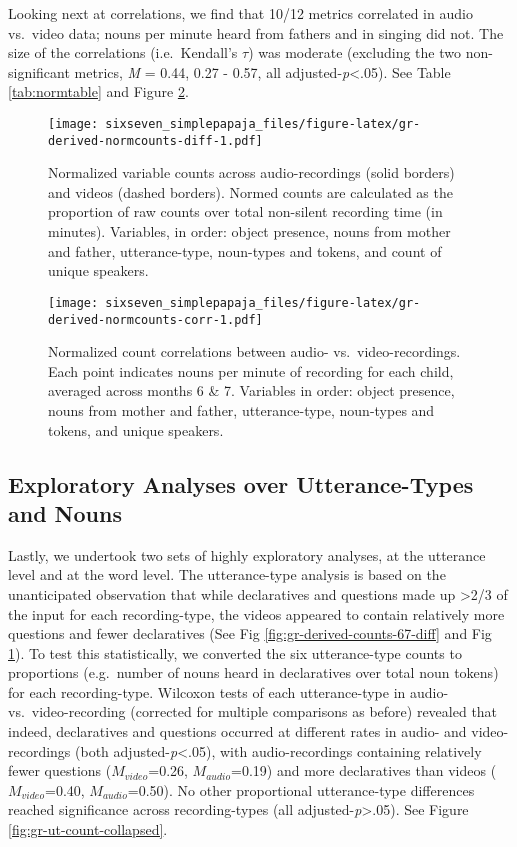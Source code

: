 \documentclass[floatsintext,man]{apa6}
\theoremstyle{definition}
\theoremstyle{definition}
\theoremstyle{definition}
\theoremstyle{remark}
\begin{document}
Looking next at correlations, we find that 10/12 metrics correlated in
audio vs.~video data; nouns per minute heard from fathers and in singing
did not. The size of the correlations (i.e.~Kendall's \(\tau\)) was
moderate (excluding the two non-significant metrics, \emph{M} = 0.44,
0.27 - 0.57, all adjusted-\emph{p}\textless{}.05). See Table
\ref{tab:normtable} and Figure \ref{fig:gr-derived-normcounts-corr}.

\begin{figure}
\centering
\texttt{[image: sixseven\_simplepapaja\_files/figure-latex/gr-derived-normcounts-diff-1.pdf]}
\caption{\label{fig:gr-derived-normcounts-diff}Normalized variable counts
across audio-recordings (solid borders) and videos (dashed borders).
Normed counts are calculated as the proportion of raw counts over total
non-silent recording time (in minutes). Variables, in order: object
presence, nouns from mother and father, utterance-type, noun-types and
tokens, and count of unique speakers.}
\end{figure}

\begin{figure}
\centering
\texttt{[image: sixseven\_simplepapaja\_files/figure-latex/gr-derived-normcounts-corr-1.pdf]}
\caption{\label{fig:gr-derived-normcounts-corr}Normalized count correlations
between audio- vs.~video-recordings. Each point indicates nouns per
minute of recording for each child, averaged across months 6 \& 7.
Variables in order: object presence, nouns from mother and father,
utterance-type, noun-types and tokens, and unique speakers.}
\end{figure}

\hypertarget{exploratory-analyses-over-utterance-types-and-nouns}{%
\subsection{Exploratory Analyses over Utterance-Types and
Nouns}\label{exploratory-analyses-over-utterance-types-and-nouns}}

Lastly, we undertook two sets of highly exploratory analyses, at the
utterance level and at the word level. The utterance-type analysis is
based on the unanticipated observation that while declaratives and
questions made up \textgreater{}2/3 of the input for each
recording-type, the videos appeared to contain relatively more questions
and fewer declaratives (See Fig \ref{fig:gr-derived-counts-67-diff} and
Fig \ref{fig:gr-derived-normcounts-diff}). To test this statistically,
we converted the six utterance-type counts to proportions (e.g.~number
of nouns heard in declaratives over total noun tokens) for each
recording-type. Wilcoxon tests of each utterance-type in audio-
vs.~video-recording (corrected for multiple comparisons as before)
revealed that indeed, declaratives and questions occurred at different
rates in audio- and video-recordings (both
adjusted-\emph{p}\textless{}.05), with audio-recordings containing
relatively fewer questions (\(M_{video}\)=0.26, \(M_{audio}\)=0.19) and
more declaratives than videos (\(M_{video}\)=0.40, \(M_{audio}\)=0.50).
No other proportional utterance-type differences reached significance
across recording-types (all adjusted-\emph{p}\textgreater{}.05). See
Figure \ref{fig:gr-ut-count-collapsed}.
\end{document}
